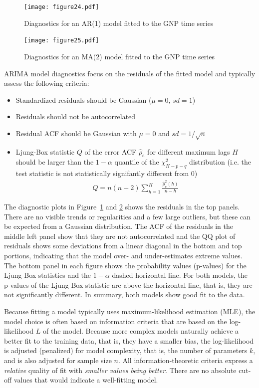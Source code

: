 \begin{figure}
\centering
\texttt{[image: figure24.pdf]}
\caption{Diagnostics for an AR(1) model fitted to the GNP time series}
\label{fig:figure24}
\end{figure}

\begin{figure}
\centering
\texttt{[image: figure25.pdf]}
\caption{Diagnostics for an MA(2) model fitted to the GNP time series}
\label{fig:figure25}
\end{figure}

ARIMA model diagnostics focus on the residuals of the fitted model and typically assess the following criteria:

\begin{itemize}
   \item Standardized residuals should be Gaussian ($\mu=0$, $sd=1$)
   \item Residuals should not be autocorrelated
   \item Residual ACF should be Gaussian with $\mu=0$ and $sd=1/\sqrt{n}$
   \item Ljung-Box statistic $Q$ of the error ACF $\hat\rho_e$ for different maximum lags $H$ should be larger than the $1-\alpha$ quantile of the $\chi^2_{H-p-q}$ distribution (i.e. the test statistic is not statistically signifantly different from $0$)
   \begin{align*}
   Q = n(n+2) \sum_{h=1}^H \frac{\hat\rho_e^2(h)}{n-h}
   \end{align*}
\end{itemize}

The diagnostic plots in Figure~\ref{fig:figure24} and \ref{fig:figure25} shows the residuals in the top panels. There are no visible trends or regularities and a few large outliers, but these can be expected from a Gaussian distribution. The ACF of the residuals in the middle left panel show that they are not autocorrelated and the QQ plot of residuals shows some deviations from a linear diagonal in the bottom and top portions, indicating that the model over- and under-estimates extreme values. The bottom panel in each figure shows the probability values (p-values) for the Ljung Box statistics and the $1-\alpha$ dashed horizontal line. For both models, the p-values of the Ljung Box statistic are above the horizontal line, that is, they are not significantly different. In summary, both models show good fit to the data.

Because fitting a model typically uses maximum-likelihood estimation (MLE), the model choice is often based on information criteria that are based on the log-likelihood $L$ of the model. Because more complex models naturally achieve a better fit to the training data, that is, they have a smaller bias, the log-likelihood is adjusted (penalized) for model complexity, that is, the number of parameters $k$, and is also adjusted for sample size $n$. All information-theoretic criteria express a \emph{relative} quality of fit with \emph{smaller values being better}. There are no absolute cut-off values that would indicate a well-fitting model.

